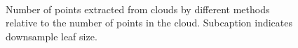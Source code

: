 \documentclass[11pt,a4paper]{kth-mag}
\begin{document}
\begin{figure}
  \centering
  \\
  \caption{Number of points extracted from clouds by different methods relative
    to the number of points in the cloud. Subcaption indicates downsample leaf
    size.}
  \label{fig:interest_points}
\end{figure}
\end{document}
